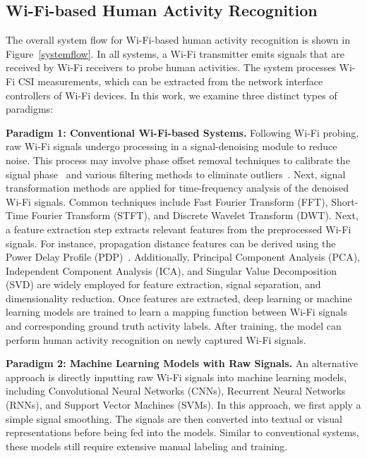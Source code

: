 \subsection{Wi-Fi-based Human Activity Recognition} \label{systems}
The overall system flow for Wi-Fi-based human activity recognition is shown in Figure~\ref{systemflow}. In all systems, a Wi-Fi transmitter emits signals that are received by Wi-Fi receivers to probe human activities. The system processes Wi-Fi CSI measurements, which can be extracted from the network interface controllers of Wi-Fi devices.
In this work, we examine three distinct types of paradigms:

\textbf{Paradigm 1: Conventional Wi-Fi-based Systems.} Following Wi-Fi probing, raw Wi-Fi signals undergo processing in a signal-denoising module to reduce noise. This process may involve phase offset removal techniques to calibrate the signal phase~\cite{guo2017wifi, kotaru2015spotfi} and various filtering methods to eliminate outliers~\cite{ali2017recognizing}.
Next, signal transformation methods are applied for time-frequency analysis of the denoised Wi-Fi signals. Common techniques include Fast Fourier Transform (FFT), Short-Time Fourier Transform (STFT), and Discrete Wavelet Transform (DWT).
Next, a feature extraction step extracts relevant features from the preprocessed Wi-Fi signals. For instance, propagation distance features can be derived using the Power Delay Profile (PDP)~\cite{xie2015precise}. Additionally, Principal Component Analysis (PCA), Independent Component Analysis (ICA), and Singular Value Decomposition (SVD) are widely employed for feature extraction, signal separation, and dimensionality reduction.
Once features are extracted, deep learning or machine learning models are trained to learn a mapping function between Wi-Fi signals and corresponding ground truth activity labels. After training, the model can perform human activity recognition on newly captured Wi-Fi signals.

\textbf{Paradigm 2: Machine Learning Models with Raw Signals.}
An alternative approach is directly inputting raw Wi-Fi signals into machine learning models, including Convolutional Neural Networks (CNNs), Recurrent Neural Networks (RNNs), and Support Vector Machines (SVMs).
In this approach, we first apply a simple signal smoothing. The signals are then converted into textual or visual representations before being fed into the models. Similar to conventional systems, these models still require extensive manual labeling and training.

